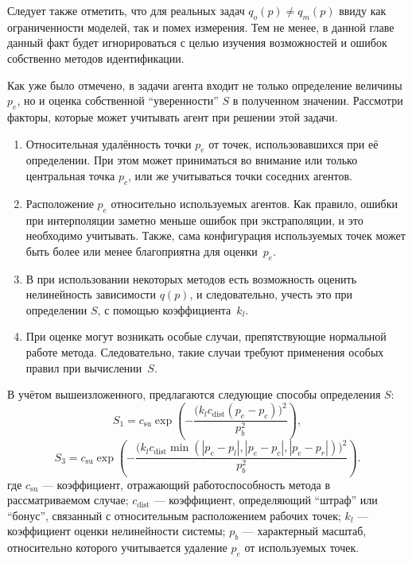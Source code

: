 Следует также отметить, что для реальных задач
$q_o(p) \ne q_m(p)$ ввиду как ограниченности моделей,
так и помех измерения. Тем не менее,
в данной главе данный факт будет игнорироваться
с целью изучения возможностей и ошибок
собственно методов идентификации.




Как уже было отмечено, в задачи агента входит
не только определение величины $p_e$,
но и оценка собственной ``уверенности'' $S$
в полученном значении. Рассмотри факторы,
которые может учитывать агент при решении этой задачи.

\begin{enumerate}

  \item Относительная удалённость точки $p_e$ от точек, использовавшихся при
    её определении. При этом может приниматься во внимание или только центральная точка $p_c$,
    или же учитываться точки соседних агентов.

  \item
    Расположение $p_e$ относительно используемых агентов. Как правило, ошибки при интерполяции
    заметно меньше ошибок при экстраполяции, и это необходимо учитывать. Также,
    сама конфигурация используемых точек может быть более или менее благоприятна
    для оценки~$p_e$.

  \item
    В при использовании некоторых методов есть возможность оценить нелинейность
    зависимости $q(p)$, и следовательно, учесть это при определении $S$,
    с помощью коэффициента~$k_l$.

  \item
    При оценке могут возникать особые случаи, препятствующие
    нормальной работе метода. Следовательно, такие случаи требуют применения особых правил
    при вычислении~$S$.

\end{enumerate}

В учётом вышеизложенного, предлагаются
следующие способы определения $S$:
%
\begin{equation}
  S_1 = c_\mathrm{su} \exp \left( - \frac{ \big( k_l c_\mathrm{dist} ( p_e - p_c ) \big)^2 }{p_b^2} \right)
  ,
  \label{atu:eq:S1}
\end{equation}
%
\begin{equation}
  S_3 = c_\mathrm{su} \exp \left( - \frac{ \big( k_l c_\mathrm{dist} \min( |p_e - p_l|,|p_e - p_c|, |p_e - p_r| ) \big)^2 }{p_b^2} \right)
  .
  \label{atu:eq:S3}
\end{equation}
%
где
$c_\mathrm{su}$ --- коэффициент, отражающий работоспособность метода в рассматриваемом случае;
$c_\mathrm{dist}$ ---  коэффициент, определяющий ``штраф'' или ``бонус'', связанный с относительным расположением рабочих точек;
$k_l$ --- коэффициент оценки нелинейности системы;
$p_b$ --- характерный масштаб, относительно которого учитывается удаление $p_e$ от используемых точек.

